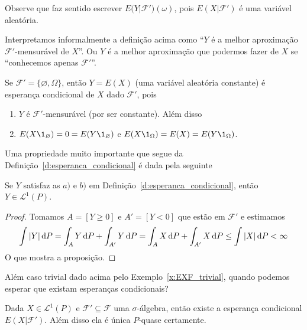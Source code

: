 Observe que faz sentido escrever $E\big(Y|\mathcal{F}'\big)(\omega)$, pois $E(X|\mathcal{F}')$ é uma variável aleatória.

Interpretamos informalmente a definição acima como ``$Y$ é a melhor aproximação $\mathcal{F}'$-mensurável de $X$''.
Ou $Y$ é a melhor aproximação que podermos fazer de $X$ se ``conhecemos apenas $\mathcal{F}'$''.

\begin{example}
  \label{x:EXF_trivial}
  Se $\mathcal{F}' = \{\varnothing, \Omega\}$, então $Y = E(X)$ (uma variável aleatória constante) é esperança condicional de $X$ dado $\mathcal{F}'$, pois
  \begin{enumerate}[\quad a)]
  \item $Y$ é $\mathcal{F}'$-mensurável (por ser constante). Além disso
  \item $E(X \1_\varnothing) = 0 = E(Y \1_\varnothing)$ e $E(X \1_\Omega) = E(X) = E(Y \1_\Omega)$.
  \end{enumerate}
\end{example}

Uma propriedade muito importante que segue da Definição~\ref{d:esperanca_condicional} é dada pela seguinte

\begin{proposition}
  \label{p:ec_em_L1}
  Se $Y$ satisfaz as $a)$ e $b)$ em Definição~\ref{d:esperanca_condicional}, então $Y \in \mathcal{L}^1(P)$.
\end{proposition}

\begin{proof}
  Tomamos $A = [Y \geq 0]$ e $A' = [Y < 0]$ que estão em $\mathcal{F}'$ e estimamos
  \begin{equation}
    \int |Y| \mathop{}\!\mathrm{d} P = \int_A Y \mathop{}\!\mathrm{d} P + \int_{A'} Y \mathop{}\!\mathrm{d} P = \int_A X \mathop{}\!\mathrm{d} P + \int_{A'} X \mathop{}\!\mathrm{d} P \leq \int |X| \mathop{}\!\mathrm{d} P < \infty
  \end{equation}
  O que mostra a proposição.
\end{proof}

Além caso trivial dado acima pelo Exemplo~\ref{x:EXF_trivial}, quando podemos esperar que existam esperanças condicionais?

\begin{theorem}
  Dada $X \in \mathcal{L}^1(P)$ e $\mathcal{F}' \subseteq \mathcal{F}$ uma $\sigma$-álgebra, então existe a esperança condicional $E(X|\mathcal{F}')$.
  Além disso ela é única $P$-quase certamente.
\end{theorem}

